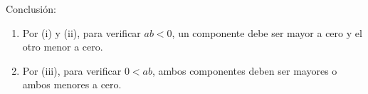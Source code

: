 \documentclass[11pt]{article}
\begin{document}
\begin{enumerate}[label=\alph*)]
 Conclusión:
 \begin{enumerate}[label=\arabic*)]
  \item Por (i) y (ii), para verificar $ab<0$, un componente debe ser mayor a cero y el otro menor a cero.%
  \item Por (iii), para verificar $0<ab$, ambos componentes deben ser mayores o ambos menores a cero.%
 \end{enumerate}
%

\end{enumerate}
\end{document}
